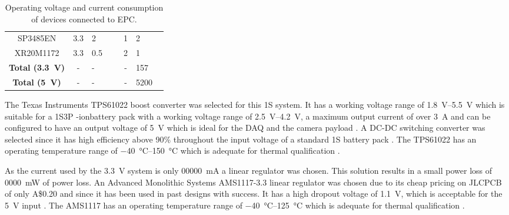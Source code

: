 \documentclass[a4paper,11pt]{article}
\newcommand{\liion}{\ce{Li}-ion}
\newcommand{\aud}{A\$}
\begin{document}
\begin{table}[H]
\begin{tabular}{|c|c|p{0.2\linewidth}|c|p{0.2\linewidth}|}
    SP3485EN                         & 3.3                           & 2 \cite{maxlinear2021sp3485}                   & 1                 & 2                                         \\
    XR20M1172                        & 3.3                           & 0.5 \cite{maxlinear2022xr20m1172}              & 2                 & 1                                         \\
    \hline
    \textbf{Total (\SI{3.3}{\volt})} & -                             & -                                              & -                 & 157                                       \\
    \textbf{Total (\SI{5}{\volt})}   & -                             & -                                              & -                 & 5200                                      \\
    \hline
  \end{tabular}
  \caption{Operating voltage and current consumption of devices connected to EPC.}
  \label{tabl:epc-power-budget}
\end{table}

The Texas Instruments TPS61022 boost converter was selected for this 1S system. It has a working voltage range of \SIrange{1.8}{5.5}{\volt} which is suitable for a 1S3P \liion battery pack with a working voltage range of \SIrange{2.5}{4.2}{\volt}, a maximum output current of over \SI{3}{\ampere} and can be configured to have an output voltage of \SI{5}{\volt} which is ideal for the DAQ and the camera payload \cite{ti2021tps61022}. A DC-DC switching converter was selected since it has high efficiency above 90\% throughout the input voltage of a standard 1S battery pack \cite{ti2021tps61022}. The TPS61022 has an operating temperature range of \SIrange{-40}{150}{\degreeCelsius} which is adequate for thermal qualification \cite{ti2021tps61022}.

As the current used by the \SI{3.3}{\volt} system is only \SI{00000}{\milli\ampere} a linear regulator was chosen. This solution results in a small power loss of \SI{0000}{\milli\watt} of power loss. %
An Advanced Monolithic Systems AMS1117-3.3 linear regulator was chosen due to its cheap pricing on JLCPCB of only \aud 0.20 and since it has been used in past designs with success. It has a high dropout voltage of \SI{1.1}{\volt}, which is acceptable for the \SI{5}{\volt} input \cite{ams2007ams1117}. The AMS1117 has an operating temperature range of \SIrange{-40}{125}{\degreeCelsius} which is adequate for thermal qualification \cite{ams2007ams1117}.
\end{document}
